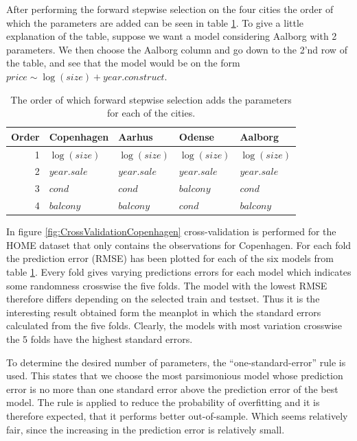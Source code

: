 After performing the forward stepwise selection on the four cities the order of which the parameters are added can be seen in table \ref{tbl:order_of_parameters}.
To give a little explanation of the table, suppose we want a model considering Aalborg with 2 parameters.
We then choose the Aalborg column and go down to the 2'nd row of the table, and see that the model would be on the form $price \sim \log(size) + year.construct$.
\begin{table}[H]
    \centering
    \begin{tabular}{r|llll}
        \toprule
        \textbf{Order} & \textbf{Copenhagen} & \textbf{Aarhus} & \textbf{Odense} & \textbf{Aalborg}\\
        \midrule
        1 & $\log(size)$        & $\log(size)$      & $\log(size)$      & $\log(size)$ \\
        2 & $year.sale$         & $year.sale$       & $year.sale$       & $year.sale$ \\
        3 & $cond$    & $cond$  & $balcony$  & $cond$ \\
        4 & $balcony$           & $balcony$            & $cond$         & $balcony$ \\
        \bottomrule
    \end{tabular}
    \caption{The order of which forward stepwise selection adds the parameters for each of the cities.}
    \label{tbl:order_of_parameters}
\end{table}

In figure \ref{fig:CrossValidationCopenhagen} cross-validation is performed for the HOME dataset that only contains the observations for Copenhagen.
For each fold the prediction error (RMSE) has been plotted for each of the six models from table \ref{tbl:order_of_parameters}. Every fold gives varying predictions errors for each model which indicates some randomness crosswise the five folds. The model with the lowest RMSE therefore differs depending on the selected train and testset. Thus it is the interesting result obtained form the meanplot in which the  standard errors calculated from the five folds. Clearly, the models with most variation crosswise the 5 folds have the highest standard errors. 

To determine the desired number of parameters, the ``one-standard-error'' rule is used. 
This states that we choose the most parsimonious model whose prediction error is no more than one standard error above the prediction error of the best model. The rule is applied to reduce the probability of overfitting and it is therefore expected, that it performs better out-of-sample. Which seems relatively fair, since the increasing in the prediction error is relatively small.

